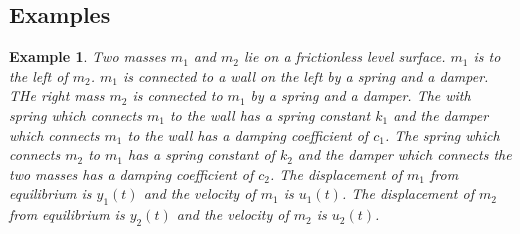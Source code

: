 \documentclass[11pt]{book}
\theoremstyle{example}
\newtheorem{example}{Example}[section]
\begin{document}
\subsection{Examples}

\begin{example}

Two masses $m_1$ and $m_2$ lie on a frictionless level surface. $m_1$ is to the left of $m_2$. $m_1$ is connected to a wall on the left by a spring and a damper. THe right mass $m_2$ is connected to $m_1$ by a spring and a damper. The with spring which connects $m_1$ to the wall has a spring constant $k_1$ and the damper which connects  $m_1$ to the wall has a damping coefficient of $c_1$. The spring which connects $m_2$ to $m_1$ has a spring constant of $k_2$ and the damper which connects the two masses has a damping coefficient of $c_2$. The displacement of $m_1$ from equilibrium is $y_1(t)$ and the velocity of $m_1$ is $u_1(t)$. The displacement of $m_2$ from equilibrium is $y_2(t)$ and the velocity of $m_2$ is $u_2(t)$. 


\end{example}
\end{document}
